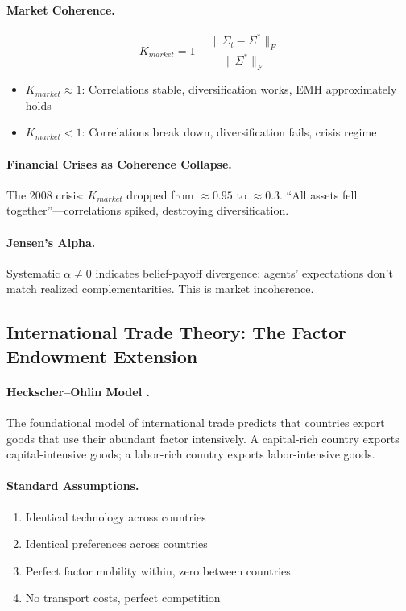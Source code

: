 \documentclass[12pt,a4paper]{article}
\begin{document}
\paragraph{Market Coherence.}
\begin{equation}
  K_{market} = 1 - \frac{\|\Sigma_t - \Sigma^*\|_F}{\|\Sigma^*\|_F}
\end{equation}

\begin{itemize}
  \item $K_{market} \approx 1$: Correlations stable, diversification works, EMH approximately holds
  \item $K_{market} < 1$: Correlations break down, diversification fails, crisis regime
\end{itemize}

\paragraph{Financial Crises as Coherence Collapse.}
The 2008 crisis: $K_{market}$ dropped from $\approx 0.95$ to $\approx 0.3$.
``All assets fell together''---correlations spiked, destroying diversification.

\paragraph{Jensen's Alpha.}
Systematic $\alpha \neq 0$ indicates belief-payoff divergence:
agents' expectations don't match realized complementarities.
This is market incoherence.

\subsection{International Trade Theory: The Factor Endowment Extension}

\paragraph{Heckscher--Ohlin Model \citep{heckscher1919,ohlin1933}.}
The foundational model of international trade predicts that countries export goods
that use their abundant factor intensively. A capital-rich country exports
capital-intensive goods; a labor-rich country exports labor-intensive goods.

\paragraph{Standard Assumptions.}
\begin{enumerate}
  \item Identical technology across countries
  \item Identical preferences across countries
  \item Perfect factor mobility within, zero between countries
  \item No transport costs, perfect competition
\end{enumerate}
\end{document}
